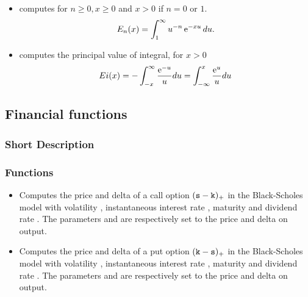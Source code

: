 \begin{itemize}
\item {}
  \sshortdescribe   computes for  $ n\geq 0, x \geq 0$ and $x>0$ if $n=0$ or $1$.
  \begin{equation*}
    E_n(x)= \int_1^{\infty} u^{-n} \operatorname{e}^{ -x u } du.
  \end{equation*}
\item {}
  \sshortdescribe   computes the principal value of integral, for $x>0$ 
  \begin{equation*}
    Ei(x) = - \int_{-x}^{\infty} \frac{\operatorname{e}^{ -u }}{u} du = \int_{-\infty}^x \frac{\operatorname{e}^{ u }}{u} du 
  \end{equation*}
\end{itemize}




\subsection{Financial functions}
\subsubsection{Short Description}
\subsubsection{Functions}


\begin{itemize}
\item
  \sshortdescribe Computes the price and delta of a call option $({\tt s} -
  {\tt k})_+$ in the Black-Scholes model with volatility ,
  instantaneous interest rate , maturity  and dividend rate
  . The parameters  and  are respectively
  set to the price and delta on output.

\item
  \sshortdescribe Computes the price and delta of a put option $({\tt k} - 
  {\tt s})_+$ in the Black-Scholes model with volatility ,
  instantaneous interest rate , maturity  and dividend rate
  .  The parameters  and  are respectively
  set to the price and delta on output.

\end{itemize}


